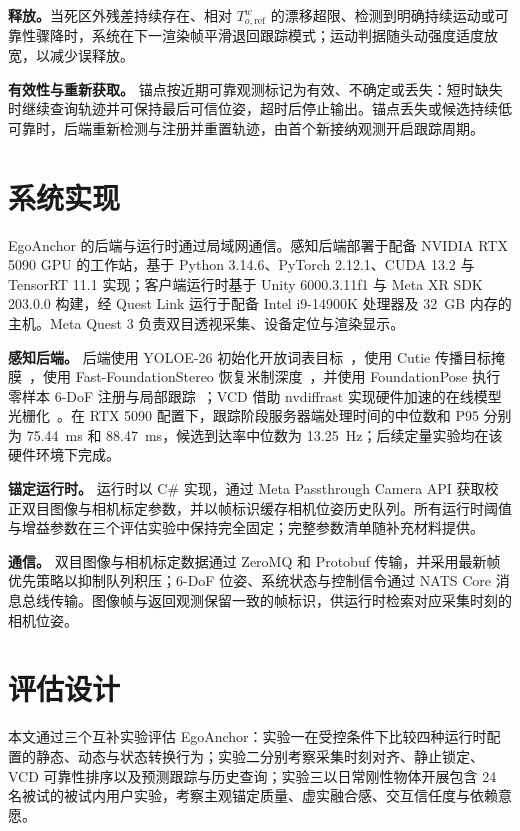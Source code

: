 \documentclass[review]{vgtc}
\begin{document}
\textbf{释放。}当死区外残差持续存在、相对 $T_{o,\mathrm{ref}}^w$ 的漂移超限、检测到明确持续运动或可靠性骤降时，系统在下一渲染帧平滑退回跟踪模式；运动判据随头动强度适度放宽，以减少误释放。

\textbf{有效性与重新获取。}\label{sec:validity}
锚点按近期可靠观测标记为有效、不确定或丢失：短时缺失时继续查询轨迹并可保持最后可信位姿，超时后停止输出。锚点丢失或候选持续低可靠时，后端重新检测与注册并重置轨迹，由首个新接纳观测开启跟踪周期。

\section{系统实现}\label{sec:implementation}

EgoAnchor 的后端与运行时通过局域网通信。感知后端部署于配备 NVIDIA RTX 5090 GPU 的工作站，基于 Python 3.14.6、PyTorch 2.12.1、CUDA 13.2 与 TensorRT 11.1 实现；客户端运行时基于 Unity 6000.3.11f1 与 Meta XR SDK 203.0.0 构建，经 Quest Link 运行于配备 Intel i9-14900K 处理器及 32~GB 内存的主机。Meta Quest 3 负责双目透视采集、设备定位与渲染显示。

\textbf{感知后端。}
后端使用 YOLOE-26 初始化开放词表目标~\cite{yoloe2025}，使用 Cutie 传播目标掩膜~\cite{cutie2024}，使用 Fast-FoundationStereo 恢复米制深度~\cite{fastfoundationstereo2026}，并使用 FoundationPose 执行零样本 6-DoF 注册与局部跟踪~\cite{foundationpose2024}；VCD 借助 nvdiffrast 实现硬件加速的在线模型光栅化~\cite{nvdiffrast2020}。在 RTX 5090 配置下，跟踪阶段服务器端处理时间的中位数和 P95 分别为 75.44~ms 和 88.47~ms，候选到达率中位数为 13.25~Hz；后续定量实验均在该硬件环境下完成。

\textbf{锚定运行时。}
运行时以 C\# 实现，通过 Meta Passthrough Camera API 获取校正双目图像与相机标定参数，并以帧标识缓存相机位姿历史队列。所有运行时阈值与增益参数在三个评估实验中保持完全固定；完整参数清单随补充材料提供。

\textbf{通信。}
双目图像与相机标定数据通过 ZeroMQ 和 Protobuf 传输，并采用最新帧优先策略以抑制队列积压；6-DoF 位姿、系统状态与控制信令通过 NATS Core 消息总线传输。图像帧与返回观测保留一致的帧标识，供运行时检索对应采集时刻的相机位姿。

\section{评估设计}\label{sec:evaluation}

本文通过三个互补实验评估 EgoAnchor：实验一在受控条件下比较四种运行时配置的静态、动态与状态转换行为；实验二分别考察采集时刻对齐、静止锁定、VCD 可靠性排序以及预测跟踪与历史查询；实验三以日常刚性物体开展包含 24 名被试的被试内用户实验，考察主观锚定质量、虚实融合感、交互信任度与依赖意愿。
\end{document}
